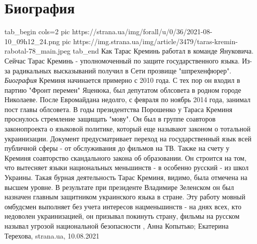  
 
 
 
 
\chapter{Биография}

\ifcmt
  tab_begin cols=2
     pic https://strana.ua/img/forall/u/0/36/2021-08-10_09h12_24.png
     pic https://img.strana.ua/img/article/3479/taras-kremin-rabotal-78_main.jpeg
  tab_end
\fi
Как Тарас Креминь работал в команде Януковича.  Сейчас Тарас Креминь -
уполномоченный по защите государственного языка. Из-за радикальных высказываний
получил в Сети прозвище "шпрехенфюрер".  \emph{Биография} Креминя начинается
примерно с 2010 года. С тех пор он входил в партию "Фронт перемен" Яценюка, был
депутатом облсовета в родном городе Николаеве.  После Евромайдана недолго, с
февраля по ноябрь 2014 года, занимал пост главы облсовета.  В годы
президентства Порошенко у Тараса Креминя проснулось стремление защищать "мову".
Он был в группе соавторов законопроекта о языковой политике, который еще
называют законом о тотальной украинизации. Документ предусматривает переход на
государственный язык всей публичной сферы - от обслуживания до фильмов на ТВ.
Также на счету у Креминя соавторство скандального закона об образовании. Он
строится на том, что вытесняет языки национальных меньшинств - в особенно
русский - из школ Украины.  Такая бурная деятельность Тарас Креминя, видимо,
была отмечена на высшем уровне. В результате при президенте Владимире Зеленском
он был назначен главным защитником украинского языка в стране. Эту работу
мовный омбудсмен выполняет без учета интересов нацменьшинств - на днях всех,
кто недоволен украинизацией, он призывал покинуть страну, фильмы на русском
называл угрозой национальной безопасности
, 
Анна Копытько; Екатерина Терехова, strana.ua, 10.08.2021
